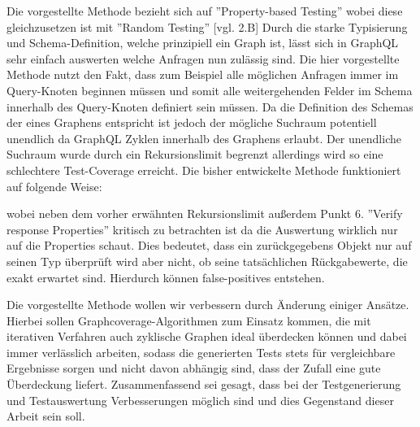 Die vorgestellte Methode bezieht sich auf ''Property-based Testing'' wobei diese gleichzusetzen ist mit ''Random Testing'' \cite{property-based-testing}[vgl. 2.B]
Durch die starke Typisierung und Schema-Definition, welche prinzipiell ein Graph ist, lässt sich in GraphQL
sehr einfach auswerten welche Anfragen nun zulässig sind.
Die hier vorgestellte Methode nutzt den Fakt, dass zum Beispiel alle möglichen Anfragen immer im Query-Knoten
beginnen müssen und somit alle weitergehenden Felder im Schema innerhalb des Query-Knoten definiert sein müssen.
Da die Definition des Schemas der eines Graphens entspricht ist jedoch der mögliche Suchraum potentiell unendlich da GraphQL
Zyklen innerhalb des Graphens erlaubt.
Der unendliche Suchraum wurde durch ein Rekursionslimit begrenzt allerdings wird so eine schlechtere Test-Coverage erreicht.
\newpage
Die bisher entwickelte Methode funktioniert auf folgende Weise:



wobei neben dem vorher erwähnten Rekursionslimit außerdem Punkt 6. ''Verify response Properties'' kritisch
zu betrachten ist da die Auswertung wirklich nur auf die Properties schaut.
Dies bedeutet, dass ein zurückgegebens Objekt nur auf seinen Typ überprüft wird aber nicht, ob seine tatsächlichen Rückgabewerte, die exakt erwartet sind.
Hierdurch können false-positives entstehen.

Die vorgestellte Methode wollen wir verbessern durch Änderung einiger Ansätze.
Hierbei sollen Graphcoverage-Algorithmen zum Einsatz kommen, die mit iterativen Verfahren auch zyklische Graphen ideal
überdecken können und dabei immer verlässlich arbeiten, sodass die generierten Tests stets für vergleichbare Ergebnisse sorgen und nicht
davon abhängig sind, dass der Zufall eine gute Überdeckung liefert.
Zusammenfassend sei gesagt, dass bei der Testgenerierung und Testauswertung Verbesserungen möglich sind und dies Gegenstand dieser Arbeit sein soll.













































